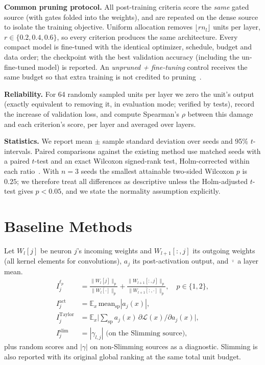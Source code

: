 \documentclass[conference]{IEEEtran}
\begin{document}
\textbf{Common pruning protocol.} All post-training criteria score the \emph{same} gated
source (with gates folded into the weights), and are repeated on the dense source to
isolate the training objective. Uniform allocation removes $\lfloor r n_l\rfloor$ units
per layer, $r\in\{0.2,0.4,0.6\}$, so every criterion produces the same architecture.
Every compact model is fine-tuned with the identical optimizer, schedule, budget and data
order; the checkpoint with the best validation accuracy (including the un-fine-tuned
model) is reported. An \emph{unpruned + fine-tuning} control receives the same budget so
that extra training is not credited to pruning~\cite{liu2019rethinking}.

\textbf{Reliability.} For 64 randomly sampled units per layer we zero the unit's output
(exactly equivalent to removing it, in evaluation mode; verified by tests), record the
increase of validation loss, and compute Spearman's $\rho$ between this damage and each
criterion's score, per layer and averaged over layers.

\textbf{Statistics.} We report mean $\pm$ sample standard deviation over seeds and
95\% $t$-intervals. Paired comparisons against the existing method use matched seeds
with a paired $t$-test and an exact Wilcoxon signed-rank test, Holm-corrected within each
ratio~\cite{holm1979}. With $n=3$ seeds the smallest attainable two-sided Wilcoxon $p$ is
$0.25$; we therefore treat all differences as descriptive unless the Holm-adjusted
$t$-test gives $p<0.05$, and we state the normality assumption explicitly.

\section{Baseline Methods}
Let $W_l[j]$ be neuron $j$'s incoming weights and $W_{l+1}[:,j]$ its outgoing weights
(all kernel elements for convolutions), $a_j$ its post-activation output, and
$\bar{\cdot}$ a layer mean.
\begin{align}
I^{\ell_p}_{j} &= \frac{\|W_l[j]\|_p}{\overline{\|W_l[\cdot]\|_p}}+
\frac{\|W_{l+1}[:,j]\|_p}{\overline{\|W_{l+1}[:,\cdot]\|_p}},\quad p\in\{1,2\},\\
I^{\mathrm{act}}_{j} &= \mathbb{E}_x\,\mathrm{mean}_{\mathrm{sp}}|a_j(x)|,\\
I^{\mathrm{Taylor}}_{j} &= \mathbb{E}_x\Big|\textstyle\sum_{\mathrm{sp}}a_j(x)\,
\partial\mathcal{L}(x)/\partial a_j(x)\Big|,\\
I^{\mathrm{slim}}_{j} &= |\gamma_{l,j}| \text{ (on the Slimming source)},
\end{align}
plus random scores and $|\gamma|$ on non-Slimming sources as a diagnostic. Slimming is
also reported with its original global ranking at the same total unit budget.
\end{document}
